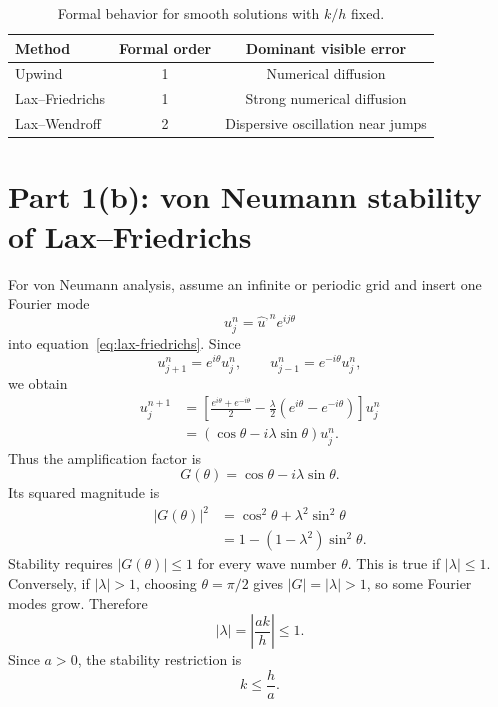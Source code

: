 \begin{table}[htbp]
\centering
\caption{Formal behavior for smooth solutions with $k/h$ fixed.}
\begin{tabular}{@{}lcc@{}}
\toprule
Method & Formal order & Dominant visible error\\
\midrule
Upwind & 1 & Numerical diffusion\\
Lax--Friedrichs & 1 & Strong numerical diffusion\\
Lax--Wendroff & 2 & Dispersive oscillation near jumps\\
\bottomrule
\end{tabular}
\end{table}

\section{Part 1(b): von Neumann stability of Lax--Friedrichs}

For von Neumann analysis, assume an infinite or periodic grid and insert one
Fourier mode
\begin{equation}
 u_j^n=\widehat u^{,n}e^{ij\theta}
\end{equation}
into equation~\eqref{eq:lax-friedrichs}. Since
\[
 u_{j+1}^n=e^{i\theta}u_j^n,
 \qquad
 u_{j-1}^n=e^{-i\theta}u_j^n,
\]
we obtain
\begin{align}
 u_j^{n+1}
 &=\left[
 \frac{e^{i\theta}+e^{-i\theta}}{2}
 -\frac{\lambda}{2}
 (e^{i\theta}-e^{-i\theta})
 \right]u_j^n\\
 &=\left(\cos\theta-i\lambda\sin\theta\right)u_j^n.
\end{align}
Thus the amplification factor is
\begin{equation}
 G(\theta)=\cos\theta-i\lambda\sin\theta.
\end{equation}
Its squared magnitude is
\begin{align}
 |G(\theta)|^2
 &=\cos^2\theta+\lambda^2\sin^2\theta\\
 &=1-(1-\lambda^2)\sin^2\theta.
\end{align}
Stability requires $|G(\theta)|\leq1$ for every wave number $\theta$. This is
true if $|\lambda|\leq1$. Conversely, if $|\lambda|>1$, choosing
$\theta=\pi/2$ gives $|G|=|\lambda|>1$, so some Fourier modes grow. Therefore
\begin{equation}
 \boxed{|\lambda|=\left|\frac{ak}{h}\right|\leq1.}
\end{equation}
Since $a>0$, the stability restriction is
\begin{equation}
 \boxed{k\leq\frac{h}{a}.}
\end{equation}

